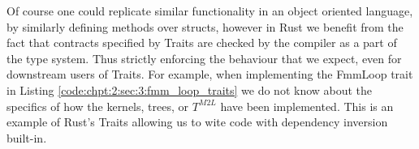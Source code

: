 Of course one could replicate similar functionality in an object oriented language, by similarly defining methods over structs, however in Rust we benefit from the fact that contracts specified by Traits are checked by the compiler as a part of the type system. Thus strictly enforcing the behaviour that we expect, even for downstream users of Traits. For example, when implementing the FmmLoop trait in Listing \ref{code:chpt:2:sec:3:fmm_loop_traits} we do not know about the specifics of how the kernels, trees, or $T^{M2L}$ have been implemented. This is an example of Rust's Traits allowing us to wite code with dependency inversion built-in.
